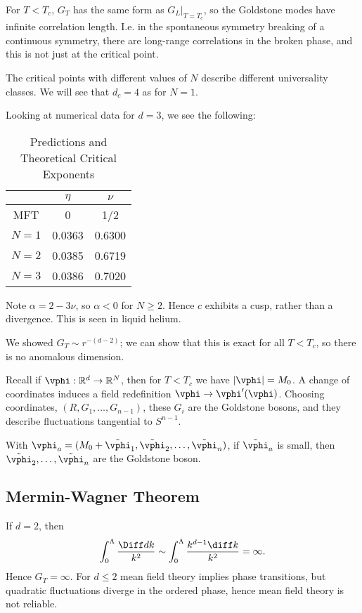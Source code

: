 \documentclass[12pt]{article}
\begin{document}
For $T < T_c$, $G_T$ has the same form as $G_{L}|_{T = T_c}$, so the Goldstone modes have infinite correlation length. I.e. in the spontaneous symmetry breaking of a continuous symmetry, there are long-range correlations in the broken phase, and this is not just at the critical point.

The critical points with different values of $N$ describe different universality classes. We will see that $d_c = 4$ as for $N = 1$.

Looking at numerical data for $d = 3$, we see the following:

\begin{table}[ht]
\centering
\begin{tabular}{c|cc}
	& $\eta$ & $\nu$ \\
\hline
	MFT & 0 & 1/2 \\
	$N = 1$ & 0.0363 & 0.6300 \\
	$N = 2$ & 0.0385 & 0.6719 \\
	$N = 3$ & 0.0386 & 0.7020
\end{tabular}
\caption{Predictions and Theoretical Critical Exponents}
\end{table}

Note $\alpha = 2 - 3 \nu$, so $\alpha < 0$ for $N \geq 2$. Hence $c$ exhibits a cusp, rather than a divergence. This is seen in liquid helium.


We showed $G_T \sim r^{-(d-2)}$; we can show that this is exact for all $T < T_c$, so there is no anomalous dimension.

Recall if $\vphi : \mathbb{R}^d \to \mathbb{R}^N$, then for $T < T_c$ we have $|\vphi| = M_0$. A change of coordinates induces a field redefinition $\vphi \to \vphi'(\vphi)$. Choosing coordinates, $(R, G_1, \ldots, G_{n-1})$, these $G_i$ are the Goldstone bosons, and they describe fluctuations tangential to $S^{n-1}$.

With $\vphi_a = (M_0 + \tilde \vphi_1, \tilde \vphi_2, \ldots, \tilde \vphi_n)$, if $\tilde \vphi_a$ is small, then $\tilde \vphi_2, \ldots, \tilde \vphi_n$ are the Goldstone boson.

\subsection{Mermin-Wagner Theorem}%
\label{sub:mgt}

If $d = 2$, then
\[
\int_0^\Lambda \frac{\Diff d k}{k^2} \sim \int_0^\Lambda \frac{k^{d-1} \diff k}{k^2} = \infty.
\]
Hence $G_T = \infty$. For $d \leq 2$ mean field theory implies phase transitions, but quadratic fluctuations diverge in the ordered phase, hence mean field theory is not reliable.
\end{document}
